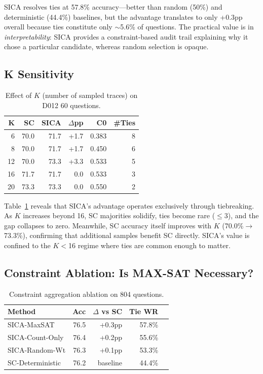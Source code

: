 \documentclass[11pt,a4paper]{article}
\begin{document}
SICA resolves ties at 57.8\% accuracy---better than random (50\%) and deterministic (44.4\%) baselines, but the advantage translates to only +0.3pp overall because ties constitute only $\sim$5.6\% of questions. The practical value is in \emph{interpretability}: SICA provides a constraint-based audit trail explaining why it chose a particular candidate, whereas random selection is opaque.

\subsection{K Sensitivity}

\begin{table}[t]
\centering
\small
\caption{Effect of $K$ (number of sampled traces) on D012 60 questions.}
\label{tab:ksens}
\begin{tabular}{rrrrrr}
\toprule
\textbf{K} & \textbf{SC} & \textbf{SICA} & \textbf{$\Delta$pp} & \textbf{C0} & \textbf{\#Ties} \\
\midrule
6 & 70.0 & 71.7 & +1.7 & 0.383 & 8 \\
8 & 70.0 & 71.7 & +1.7 & 0.450 & 6 \\
12 & 70.0 & 73.3 & +3.3 & 0.533 & 5 \\
16 & 71.7 & 71.7 & 0.0 & 0.533 & 3 \\
20 & 73.3 & 73.3 & 0.0 & 0.550 & 2 \\
\bottomrule
\end{tabular}
\end{table}

Table~\ref{tab:ksens} reveals that SICA's advantage operates exclusively through tiebreaking. As $K$ increases beyond 16, SC majorities solidify, ties become rare ($\leq$3), and the gap collapses to zero. Meanwhile, SC accuracy itself improves with $K$ (70.0\%$\rightarrow$73.3\%), confirming that additional samples benefit SC directly. SICA's value is confined to the $K$$<$16 regime where ties are common enough to matter.

\subsection{Constraint Ablation: Is MAX-SAT Necessary?}

\begin{table}[t]
\centering
\small
\caption{Constraint aggregation ablation on 804 questions.}
\label{tab:ablation}
\begin{tabular}{lrrrr}
\toprule
\textbf{Method} & \textbf{Acc} & \textbf{$\Delta$ vs SC} & \textbf{Tie WR} \\
\midrule
SICA-MaxSAT & 76.5 & +0.3pp & 57.8\% \\
SICA-Count-Only & 76.4 & +0.2pp & 55.6\% \\
SICA-Random-Wt & 76.3 & +0.1pp & 53.3\% \\
SC-Deterministic & 76.2 & baseline & 44.4\% \\
\bottomrule
\end{tabular}
\end{table}
\end{document}
